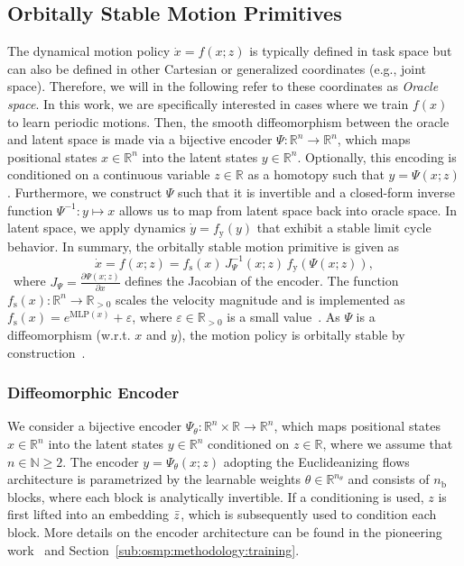 \subsection{Orbitally Stable Motion Primitives}
The dynamical motion policy $\dot{x}=f(x; z)$ is typically defined in task space but can also be defined in other Cartesian or generalized coordinates (e.g., joint space). Therefore, we will in the following refer to these coordinates as \emph{Oracle space}.
In this work, we are specifically interested in cases where we train $f(x)$ to learn periodic motions.
Then, the smooth diffeomorphism between the oracle and latent space is made via a bijective encoder $\Psi: \mathbb{R}^n \to \mathbb{R}^n$, which maps positional states $x \in \mathbb{R}^n$ into the latent states $y \in \mathbb{R}^n$.
Optionally, this encoding is conditioned on a continuous variable $z \in \mathbb{R}$ as a homotopy such that $y = \Psi(x;z)$.
Furthermore, we construct $\Psi$ such that it is invertible and a closed-form inverse function $\Psi^{-1}: y \mapsto x$ allows us to map from latent space back into oracle space.
In latent space, we apply dynamics $\dot{y} = f_\mathrm{y}(y)$ that exhibit a stable limit cycle behavior. In summary, the orbitally stable motion primitive is given as
\begin{equation}\label{eq:dynamics}
    \dot{x} = f(x;z) = f_\mathrm{s}(x) \, J_\Psi^{-1}(x;z) \, f_\mathrm{y} \left (\Psi(x;z) \right ),
\end{equation}\
where $J_\Psi = \frac{\partial \Psi(x;z)}{\partial x}$ defines the Jacobian of the encoder. 
The function $f_\mathrm{s}(x): \mathbb{R}^n \to \mathbb{R}_{>0}$ scales the velocity magnitude and is implemented as $f_\mathrm{s}(x) = e^{\mathrm{MLP}(x)} + \varepsilon$, where $\varepsilon \in \mathbb{R}_{>0}$ is a small value~\citep{rana2020euclideanizing}.
As $\Psi$ is a diffeomorphism (w.r.t. $x$ and $y$), the motion policy is orbitally stable by construction~\citep{rana2020euclideanizing, zhi2024teaching}.

\subsubsection{Diffeomorphic Encoder}
We consider a bijective encoder $\Psi_\theta : \mathbb{R}^n \times \mathbb{R} \to \mathbb{R}^n$, which maps positional states $x \in \mathbb{R}^n$ into the latent states $y \in \mathbb{R}^n$ conditioned on $z \in \mathbb{R}$, where we assume that $n \in \mathbb{N} \geq 2$.
The encoder $y = \Psi_\theta(x;z)$ adopting the Euclideanizing flows~\citep{dinh2017density, rana2020euclideanizing} architecture is parametrized by the learnable weights $\theta \in \mathbb{R}^{n_\theta}$ and consists of $n_\mathrm{b}$ blocks, where each block is analytically invertible.
If a conditioning is used, $z$ is first lifted into an embedding $\Bar{z}$, which is subsequently used to condition each block.
More details on the encoder architecture can be found in the pioneering work~\citep{dinh2017density, rana2020euclideanizing} and Section~\ref{sub:osmp:methodology:training}.


